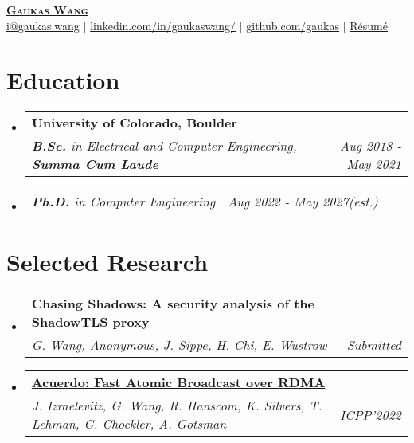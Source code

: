 \documentclass[letterpaper,11pt]{article}
\makeatletter
\newcommand{\resumeSubheading}[4]{
  \vspace{-2pt}\item
    \begin{tabular*}{0.97\textwidth}[t]{l@{\extracolsep{\fill}}r}
      \textbf{#1} & #2 \\
      \textit{\small#3} & \textit{\small #4} \\
    \end{tabular*}\vspace{-7pt}
}
\newcommand{\resumeSubSubheading}[2]{
    \item
    \begin{tabular*}{0.97\textwidth}{l@{\extracolsep{\fill}}r}
      \textit{\small#1} & \textit{\small #2} \\
    \end{tabular*}\vspace{-7pt}
}
\newcommand{\resumeProjectHeading}[2]{
    \item
    \begin{tabular*}{0.97\textwidth}{l@{\extracolsep{\fill}}r}
      \small#1 & #2 \\
    \end{tabular*}\vspace{-7pt}
}
\newcommand{\resumeSubHeadingListStart}{\begin{itemize}[leftmargin=0.15in, label={}]}
\newcommand{\resumeSubHeadingListEnd}{\end{itemize}}
\makeatother
\begin{document}
\begin{center}
  \href{https://gaukas.wang}{\textbf{\Huge \scshape Gaukas Wang}} \\ \vspace{1pt}
    \href{mailto:i@gaukas.wang}{{i@gaukas.wang}} $|$ 
    \href{https://www.linkedin.com/in/gaukaswang/}{linkedin.com/in/gaukaswang/} $|$
    \href{https://github.com/gaukas}{{github.com/gaukas}} $|$ 
    \href{https://gauk.as/resume}{{Résumé}}
    
\end{center}


\section{Education}
\resumeSubHeadingListStart
  \resumeSubheading
    {University of Colorado, Boulder}{}
    {\textbf{B.Sc.} in Electrical and Computer Engineering, \textbf{Summa Cum Laude}}{Aug 2018 - May 2021}
  \resumeSubSubheading
    {\textbf{Ph.D.} in Computer Engineering}{Aug 2022 - May 2027\textit{(est.)}}
  \resumeSubHeadingListEnd


  \vspace{1pt}

\section{Selected Research}
  \resumeSubHeadingListStart
    \resumeSubheading
      {\textbf{Chasing Shadows: A security analysis of the ShadowTLS proxy}}{}
      {\emph{G. Wang, Anonymous, J. Sippe, H. Chi, E. Wustrow} }{Submitted}
    \resumeSubheading
      {\href{https://gaukas.wang/paper/acuerdo-icpp22.pdf}{\textbf{Acuerdo: Fast Atomic Broadcast over RDMA}}}{}
      {\emph{J. Izraelevitz, G. Wang, R. Hanscom, K. Silvers, T. Lehman, G. Chockler, A. Gotsman} }{ICPP'2022}
  \resumeSubHeadingListEnd
\end{document}
